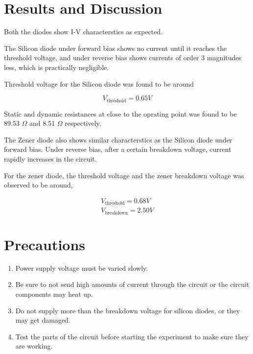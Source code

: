 \section{Results and Discussion}
Both the diodes show I-V characterstics as expected.

The Silicon diode under forward bias shows no current until it reaches the threshold voltage, and under reverse bias shows currents of order 3 magnitudes less, which is practically negligible.

Threshold voltage for the Silicon diode was found to be around 

\begin{equation*}
    V_\text{threshold} = 0.65V
\end{equation*}

Static and dynamic resistances at close to the oprating point was found to be 89.53 $\Omega$ and 8.51 $\Omega$ respectively.

The Zener diode also shows similar characterstics as the Silicon diode under forward bias. Under reverse bias, after a certain breakdown voltage, current rapidly increases in the circuit.

For the zener diode, the threshold voltage and the zener breakdown voltage was observed to be around,

\begin{align*}
    V_\text{threshold} = 0.68V\\
    V_\text{breakdown} = 2.50V
\end{align*}

\section{Precautions}
\begin{enumerate}
    \item Power supply voltage must be varied slowly.
    \item Be sure to not send high amounts of current through the circuit or the circuit components may heat up.
    \item Do not supply more than the breakdown voltage for silicon diodes, or they may get damaged.
    \item Test the parts of the circuit before starting the experiment to make sure they are working.
\end{enumerate}